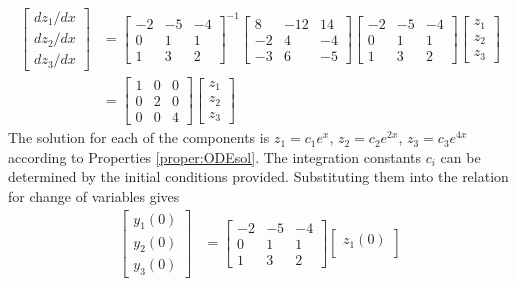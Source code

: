 \begin{solution}
\begin{align*}
\begin{bmatrix}
dz_1/dx \\
dz_2/dx \\
dz_3/dx
\end{bmatrix}
&=
\begin{bmatrix}
-2 & -5 & -4 \\
0 & 1 & 1 \\
1 & 3 & 2
\end{bmatrix}^{-1}
\begin{bmatrix}
8 & -12 & 14 \\
-2 & 4 & -4 \\
-3 & 6 & -5
\end{bmatrix}
\begin{bmatrix}
-2 & -5 & -4 \\
0 & 1 & 1 \\
1 & 3 & 2
\end{bmatrix}
\begin{bmatrix}
z_1 \\
z_2 \\
z_3
\end{bmatrix} \\
&=
\begin{bmatrix}
1 & 0 & 0\\
0 & 2 & 0\\
0 & 0 & 4
\end{bmatrix}
\begin{bmatrix}
z_1 \\
z_2 \\
z_3
\end{bmatrix}
\end{align*}
The solution for each of the components is $z_1 = c_1e^x$, $z_2 = c_2e^{2x}$, $z_3 = c_3e^{4x}$ according to Properties \ref{proper:ODEsol}. The integration constants $c_i$ can be determined by the initial conditions provided. Substituting them into the relation for change of variables gives
\begin{align*}
\begin{bmatrix}
y_1(0) \\
y_2(0) \\
y_3(0)
\end{bmatrix}
&=
\begin{bmatrix}
-2 & -5 & -4 \\
0 & 1 & 1 \\
1 & 3 & 2
\end{bmatrix}
\begin{bmatrix}
z_1(0) \\

\end{bmatrix}
\end{align*}
\end{solution}
